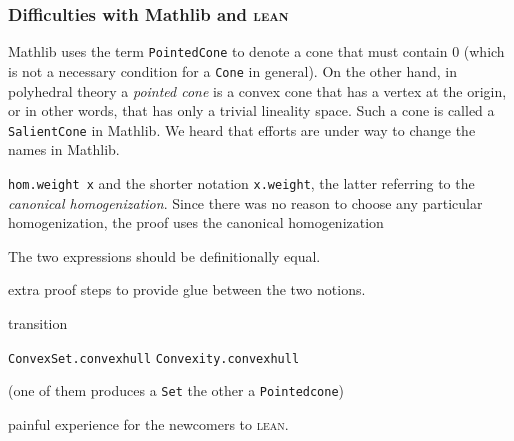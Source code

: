 \documentclass[a4paper,11pt]{article}
\newcommand\lean{\texttt}
\newcommand\LEAN{\textsc{lean}}
\begin{document}
\subsubsection{Difficulties with Mathlib and \LEAN}
\label{sec:diff-lean}

Mathlib uses the term \lean{PointedCone} to denote a cone that must
contain $0$ (which is not a necessary condition for a \lean{Cone} in general).
On the other hand,
in polyhedral theory a \emph{pointed cone} is a convex cone that has a vertex
at the origin, or in other words, that has
only a trivial lineality space. Such a cone is called a 
\lean{SalientCone} in Mathlib.
We heard that efforts are under way to change the names in Mathlib.


\lean{hom.weight x} and the shorter notation
\lean{x.weight}, the latter referring to the \emph{canonical
  homogenization}.
Since there was no reason to choose any particular 
homogenization, the proof uses the canonical
homogenization

The two expressions should be definitionally equal.


extra proof steps to provide glue between the two notions.



transition

\lean{ConvexSet.convexhull}
\lean{Convexity.convexhull}

(one of them produces a \lean{Set}
the other a \lean{Pointedcone})


painful experience for the newcomers to \LEAN.
\end{document}
